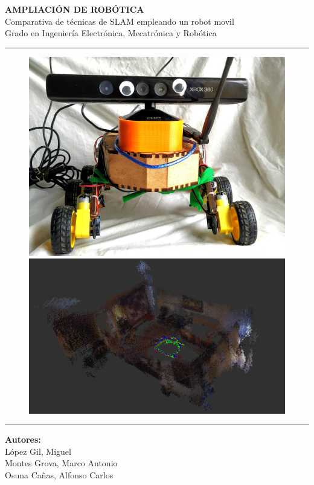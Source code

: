 \documentclass[a4paper,twoside]{article}
\begin{document}

\begin{titlepage}
\centering
\Huge{\textbf{AMPLIACIÓN DE ROBÓTICA}} \\
\Huge{Comparativa de técnicas de SLAM empleando un robot movil}\\
\vspace{0.5cm}
\LARGE{Grado en Ingeniería Electrónica, Mecatrónica y Robótica}\\
\rule{\textwidth}{0.1mm}
\begin{figure}[h!]
	\centering
	\includegraphics[width=.5\textwidth]{images/wheele_real}
	\includegraphics[width=.5\textwidth]{images/slam/bag1_rtabmapbonito}
\end{figure}
\vspace{0.1cm}
\rule{\textwidth}{0.1mm}
\Large{\textbf{Autores:} \\
                         López Gil, Miguel \\
                         Montes Grova, Marco Antonio\\
                         Osuna Cañas, Alfonso Carlos}
\end{titlepage}
\newpage
\tableofcontents
\newpage
\end{document}
